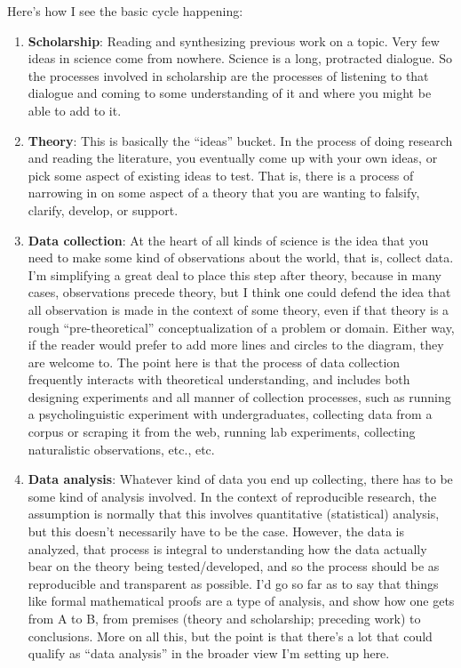 \documentclass{book}
\begin{document}
Here's how I see the basic cycle happening:

\begin{enumerate}
\item \textbf{Scholarship}: Reading and synthesizing previous work on a topic. Very few ideas in science come from nowhere.  Science is a long, protracted dialogue.  So the processes involved in scholarship are the processes of listening to that dialogue and coming to some understanding of it and where you might be able to add to it.
\item \textbf{Theory}: This is basically the ``ideas'' bucket. In the process of doing research and reading the literature, you eventually come up with your own ideas, or pick some aspect of existing ideas to test. That is, there is a process of narrowing in on some aspect of a theory that you are wanting to falsify, clarify, develop, or support.
\item \textbf{Data collection}: At the heart of all kinds of science is the idea that you need to make some kind of observations about the world, that is, collect data. I'm simplifying a great deal to place this step after theory, because in many cases, observations precede theory, but I think one could defend the idea that all observation is made in the context of some theory, even if that theory is a rough ``pre-theoretical'' conceptualization of a problem or domain.  Either way, if the reader would prefer to add more lines and circles to the diagram, they are welcome to. The point here is that the process of data collection frequently interacts with theoretical understanding, and includes both designing experiments and all manner of collection processes, such as running a psycholinguistic experiment with undergraduates, collecting data from a corpus or scraping it from the web, running lab experiments, collecting naturalistic observations, etc., etc.
\item \textbf{Data analysis}: Whatever kind of data you end up collecting, there has to be some kind of analysis involved. In the context of reproducible research, the assumption is normally that this involves quantitative (statistical) analysis, but this doesn't necessarily have to be the case. However, the data is analyzed, that process is integral to understanding how the data actually bear on the theory being tested/developed, and so the process should be as reproducible and transparent as possible. I'd go so far as to say that things like formal mathematical proofs are a type of analysis, and show how one gets from A to B, from premises (theory and scholarship; preceding work) to conclusions. More on all this, but the point is that there's a lot that could qualify as ``data analysis'' in the broader view I'm setting up here.

\end{enumerate}
\end{document}
